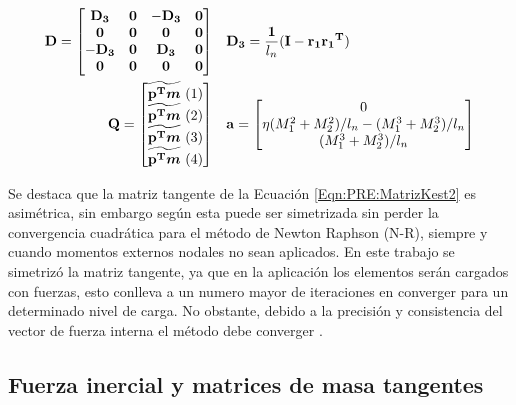 \begin{eqnarray}
	\label{Eqn:PRE:DefD}
		\bf{D}=\begin{bmatrix}
		\bf{D_3}& \bf{0}   & -\bf{D_3}   & \bf{0} \\
		\bf{0}  & \bf{0} & \bf{0}   & \bf{0}\\
		-\bf{D_3}  & \bf{0}   & \bf{D_3} & \bf{0} \\
		\bf{0}  & \bf{0}   & \bf{0}   & \bf{0}
	\end{bmatrix}&~~~\bf{D_3}=\frac{1}{\text{$l_n$}}(\bf{I}-\bf{r_1}\bf{r_1}^T)\\
    \label{Eqn:PRE:DefQ}
	\bf{Q}=\begin{bmatrix}
		\widetilde{\bf{p}^T\boldsymbol{m}} ~(1)\\
		\widetilde{\bf{p}^T\boldsymbol{m}} ~(2)\\
		\widetilde{\bf{p}^T\boldsymbol{m}} ~(3)\\
		\widetilde{\bf{p}^T\boldsymbol{m}} ~(4)
	\end{bmatrix}&~~~\bf{a} =\begin{bmatrix}
	0\\
	\eta(M_1^2+M_2^2)/l_n-(M_1^3+M_2^3)/l_n\\
	(M_1^3+M_2^3)/l_n
\end{bmatrix}
\end{eqnarray}


Se destaca que la matriz tangente de la Ecuación  \eqref{Eqn:PRE:MatrizKest2} es asimétrica, sin embargo según \cite{Nour-Omid1991} esta puede ser simetrizada sin perder la convergencia cuadrática
para el método de  Newton Raphson (N-R), siempre y cuando momentos externos nodales no sean aplicados. En este trabajo se simetrizó la matriz tangente, ya que en la aplicación los elementos serán cargados con fuerzas, esto conlleva a un numero mayor de iteraciones en converger para un determinado nivel de carga. No obstante, debido a la precisión y consistencia del vector de fuerza interna el método debe converger \cite{rankin1988use}.

\subsection{Fuerza inercial y matrices de masa tangentes}\label{Sec:PRE:Inercial}

